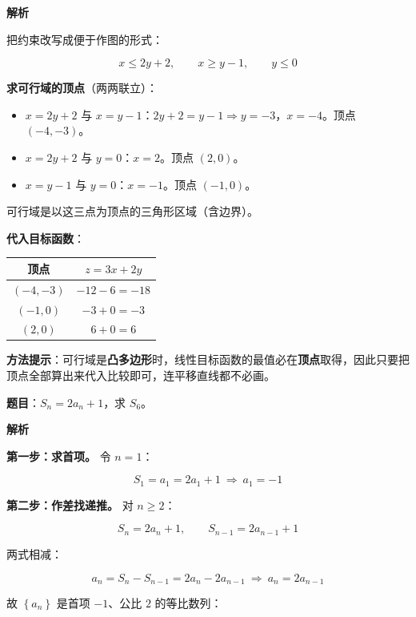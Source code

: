 \textbf{解析}

把约束改写成便于作图的形式：

\[x\le2y+2,\qquad x\ge y-1,\qquad y\le0\]

\textbf{求可行域的顶点}（两两联立）：

\begin{itemize}
\item $x=2y+2$ 与 $x=y-1$：$2y+2=y-1\Rightarrow y=-3$，$x=-4$。顶点 $(-4,-3)$。
\item $x=2y+2$ 与 $y=0$：$x=2$。顶点 $(2,0)$。
\item $x=y-1$ 与 $y=0$：$x=-1$。顶点 $(-1,0)$。
\end{itemize}

可行域是以这三点为顶点的三角形区域（含边界）。

\textbf{代入目标函数}：

\begin{center}
\begin{tabular}{cc}
\toprule
顶点 & $z=3x+2y$ \\
\midrule
$(-4,-3)$ & $-12-6=-18$ \\
$(-1,0)$ & $-3+0=-3$ \\
$(2,0)$ & $6+0=\boxed{6}$ \\
\bottomrule
\end{tabular}
\end{center}


\begin{gktip}
\textbf{方法提示}：可行域是\textbf{凸多边形}时，线性目标函数的最值必在\textbf{顶点}取得，因此只要把顶点全部算出来代入比较即可，连平移直线都不必画。
\end{gktip}

\par\medskip


\textbf{题目}：$S_n=2a_n+1$，求 $S_6$。

\textbf{解析}

\textbf{第一步：求首项。} 令 $n=1$：

\[S_1=a_1=2a_1+1\ \Longrightarrow\ a_1=-1\]

\textbf{第二步：作差找递推。} 对 $n\ge2$：

\[S_n=2a_n+1,\qquad S_{n-1}=2a_{n-1}+1\]

两式相减：

\[a_n=S_n-S_{n-1}=2a_n-2a_{n-1}\ \Longrightarrow\ a_n=2a_{n-1}\]

故 $\left\{a_n\right\}$ 是首项 $-1$、公比 $2$ 的等比数列：

